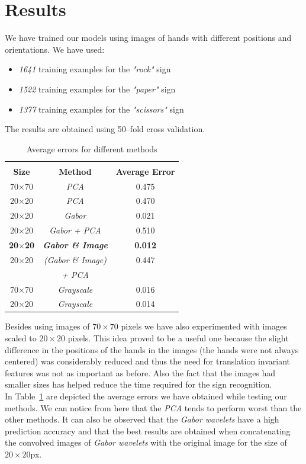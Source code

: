 \documentclass[a4paper, 11pt, twocolumn]{article}
\begin{document}
    \section{Results}
	\label{sec:results}
		We have trained our models using images of hands with different positions and orientations. We have used:
		\begin{itemize}
		\item \emph{1641} training examples for the \emph{"rock"} sign 
		\item \emph{1522} training examples for the \emph{"paper"} sign
		\item \emph{1377} training examples for the \emph{"scissors"} sign
		\end{itemize}
		The results are obtained using 50--fold cross validation.\\
		\begin{table}[!hbtp]
		\begin{tabular}{| c | c | c |}
			\hline\hline
			& & \\
			\textbf{Size} & \textbf{Method} & \textbf{Average Error}\\[5px] 
			\hline\hline
			  70$\times$70 & \emph{PCA} & 0.475\\
			\hline
			  20$\times$20 & \emph{PCA} & 0.470\\
			\hline
			  20$\times$20 & \emph{Gabor} & 0.021\\
			\hline
			  20$\times$20 & \emph{Gabor + PCA} & 0.510\\
			\hline
			  \textbf{20$\times$20} & \textbf{\emph{Gabor \& Image}} & \textbf{0.012}\\
		 	\hline
			  20$\times$20 & \emph{(Gabor \& Image)} & 0.447\\
		               & \emph {+ PCA}  &     \\ 			
			\hline
			  70$\times$70 & \emph{Grayscale} & 0.016\\
			\hline
			  20$\times$20 & \emph{Grayscale} & 0.014\\
			\hline
		\end{tabular}
		\caption{Average errors for different methods}
		\label{tab:res}
		\end{table}
		Besides using images of $70\times 70$ pixels we have also experimented with images scaled to $20 \times 20$ pixels. This idea proved to be a useful one because the slight difference in the positions of the hands in the images (the hands were not always centered) was considerably reduced and thus the need for translation invariant features was not as important as before. Also the fact that the images had smaller sizes has helped reduce the time required for the sign recognition.\\     
		\hspace*{10px}In Table~\ref{tab:res} are depicted the average errors we have obtained while testing our methods. We can notice from here that the \emph{PCA} tends to perform worst than the other methods. It can also be observed that the \emph{Gabor wavelets} have a high prediction accuracy and that the best results are obtained when concatenating the convolved images of \emph{Gabor wavelets} with the original image for the size of \emph{$20\times20$}px.  
\end{document}
